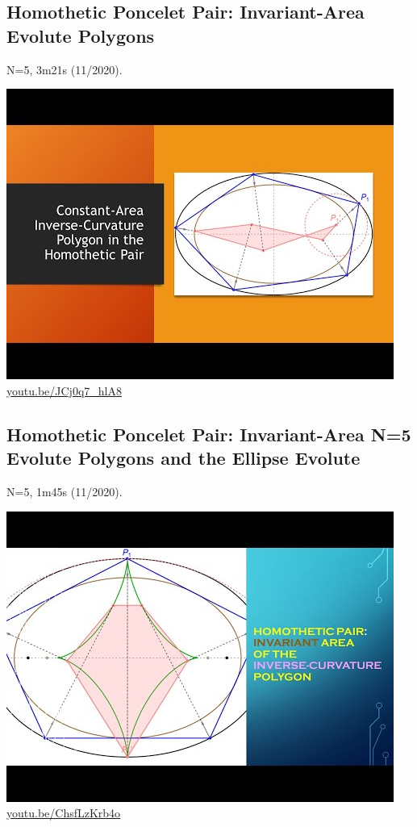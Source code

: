 \documentclass[12pt]{amsart}
\begin{document}
\subsection{Homothetic Poncelet Pair: Invariant-Area Evolute Polygons}
\label{vid:JCj0q7_hlA8}
\noindent N=5, 3m21s (11/2020). 
\begin{center}\includegraphics[width=.5\textwidth]{pics/JCj0q7_hlA8.jpg} \\ 
\href{https://youtu.be/JCj0q7_hlA8}{\url{youtu.be/JCj0q7\_hlA8}}\end{center}
% 

\subsection{Homothetic Poncelet Pair: Invariant-Area N=5 Evolute Polygons and the Ellipse Evolute}
\label{vid:ChsfLzKrb4o}
\noindent N=5, 1m45s (11/2020). 
\begin{center}\includegraphics[width=.5\textwidth]{pics/ChsfLzKrb4o.jpg} \\ 
\href{https://youtu.be/ChsfLzKrb4o}{\url{youtu.be/ChsfLzKrb4o}}\end{center}
% 
\end{document}
